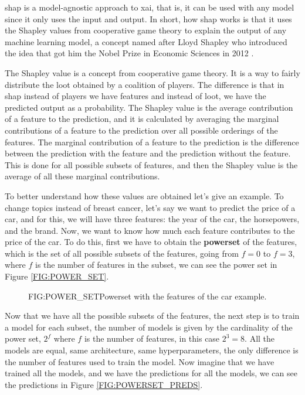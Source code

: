 
\ac{shap} \cite{lundberg_unified_2017} is a model-agnostic approach to \ac{xai}, that is, it can be used with any model since it only uses the input and output. In short, how \ac{shap} works is that it uses the Shapley values from cooperative game theory to explain the output of any machine learning model, a concept named after Lloyd Shapley who introduced the idea that got him the Nobel Prize in Economic Sciences in 2012 \cite{roth_shapley_1988}.

The Shapley value is a concept from cooperative game theory. It is a way to fairly distribute the loot obtained by a coalition of players. The difference is that in \ac{shap} instead of players we have features and instead of loot, we have the predicted output as a probability. The Shapley value is the average contribution of a feature to the prediction, and it is calculated by averaging the marginal contributions of a feature to the prediction over all possible orderings of the features. The marginal contribution of a feature to the prediction is the difference between the prediction with the feature and the prediction without the feature. 
This is done for all possible subsets of features, and then the Shapley value is the average of all these marginal contributions. 

To better understand how these values are obtained 
let's 
give an example. To change topics instead of breast cancer, 
let's 
say we want to predict the price of a car, and for this, we will have three features: the year of the car, the horsepowers, and the brand. Now, we want to know how much each feature contributes to the price of the car. To do this, first we have to obtain the \textbf{powerset} of the features, which is the set of all possible subsets of the features, going from $f=0$ to $f=3$, where $f$ is the number of features in the subset, we can see the power set in Figure \ref{FIG:POWER_SET}.

\begin{figure}[Powerset Example]{FIG:POWER_SET}{Powerset with the features of the car example.}
\end{figure}

Now that we have all the possible subsets of the features, the next step is to train a model for each subset, the number of models is given by the cardinality of the power set, $2^f$ where $f$ is the number of features, in this case $2^3=8$. All the models are equal, same architecture, same hyperparameters, the only difference is the number of features used to train the model. Now imagine that we have trained all the models, and we have the predictions for all the models, we can see the predictions in Figure \ref{FIG:POWERSET_PREDS}.

